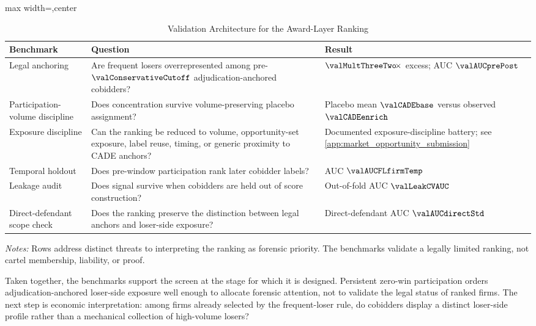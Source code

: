 \begin{table}[htbp]
\centering
\caption{Validation Architecture for the Award-Layer Ranking}
\label{tab:validation_benchmarks_submission}
\footnotesize
\begin{adjustbox}{max width=\textwidth,center}
\begin{threeparttable}
\begin{tabular}{p{3.5cm}p{5.3cm}p{4.3cm}}
\toprule
Benchmark & Question & Result \\
\midrule
Legal anchoring & Are frequent losers overrepresented among pre-$\valConservativeCutoff$ adjudication-anchored cobidders? & $\valMultThreeTwo\!\times$ excess; AUC $\valAUCprePost$ \\
Participation-volume discipline & Does concentration survive volume-preserving placebo assignment? & Placebo mean $\valCADEbase$ versus observed $\valCADEenrich$ \\
Exposure discipline & Can the ranking be reduced to volume, opportunity-set exposure, label reuse, timing, or generic proximity to CADE anchors? & Documented exposure-discipline battery; see \ref{app:market_opportunity_submission} \\
Temporal holdout & Does pre-window participation rank later cobidder labels? & AUC $\valAUCFLfirmTemp$ \\
Leakage audit & Does signal survive when cobidders are held out of score construction? & Out-of-fold AUC $\valLeakCVAUC$ \\
Direct-defendant scope check & Does the ranking preserve the distinction between legal anchors and loser-side exposure? & Direct-defendant AUC $\valAUCdirectStd$ \\
\bottomrule
\end{tabular}
\begin{tablenotes}
\footnotesize
\item \textit{Notes:} Rows address distinct threats to
interpreting the ranking as forensic priority. The benchmarks
validate a legally limited ranking, not cartel membership,
liability, or proof.
\end{tablenotes}
\end{threeparttable}
\end{adjustbox}
\end{table}

Taken together, the benchmarks support the screen at the stage
for which it is designed. Persistent zero-win participation
orders adjudication-anchored loser-side exposure well enough to
allocate forensic attention, not to validate the legal status of
ranked firms. The next step is economic interpretation: among
firms already selected by the frequent-loser rule, do cobidders
display a distinct loser-side profile rather than a mechanical
collection of high-volume losers?
